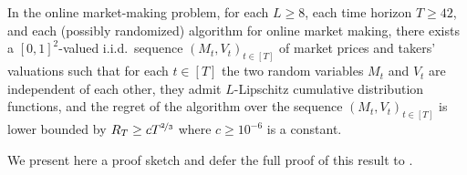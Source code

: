 \documentclass[final,12pt]{colt2025}
\newcommand{\nP}{M}
\newcommand{\nZ}{V}
\begin{document}
\begin{theorem}\label{t:lower-bound-lip-iv}
    In the online market-making problem, 
    for each $L \ge 8$, each time horizon $T \ge 42$, and each (possibly randomized) algorithm for online market making, there exists a $[0,1]^2$-valued i.i.d.\ sequence $(\nP_t,\nZ_t)_{t \in [T]}$ of market prices and takers' valuations such that for each $t \in [T]$ the two random variables $\nP_t$ and $\nZ_t$ are independent of each other, they admit $L$-Lipschitz cumulative distribution functions, and the regret of the algorithm over the sequence $(\nP_t,\nZ_t)_{t \in [T]}$ is lower bounded by
    $
        R_T \ge c T^{\nicefrac{2}{3}}
    $
    where $c \ge 10^{-6}$ is a constant.
\end{theorem}

We present here a proof sketch and defer the full proof of this result to .
\end{document}
